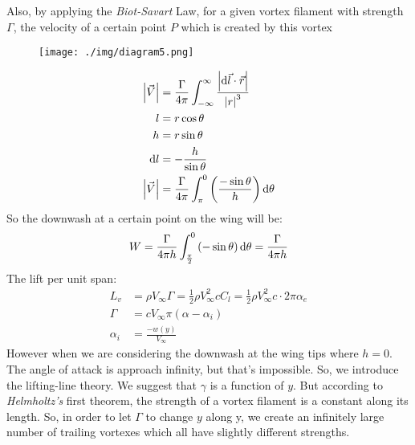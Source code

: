 Also, by applying the \textit{Biot-Savart} Law,  for a given vortex filament with strength $\Gamma$, the velocity of a certain point $P$ which is created by this vortex
\begin{figure}[H]
    \centering
    \texttt{[image: ./img/diagram5.png]}
    \caption{}
\end{figure}
\begin{align}
    \left| \vec{V} \right| & = \frac{\Gamma}{4\pi} \int_{-\infty}^{\infty} \frac{\left| \dif \vec{l} \cdot \vec{r} \right| }{ \left| r \right|^3} \\
    l                      & = r\cos{\theta}                                                                                                      \\
    h                      & = r\sin{\theta}                                                                                                      \\
    \dif l                 & = -\frac{h}{\sin{\theta}}                                                                                            \\
    \left| \vec{V} \right| & = \frac{\Gamma}{4\pi} \int_{\pi}^0 \left(\frac{-\sin{\theta}}{h}\right) \dif \theta                                  \\
\end{align}
So the downwash at a certain point on the wing will be:
\begin{align}
    W = \frac{\Gamma}{4\pi h} \int_{\frac{\pi}{2}}^0\left(-\sin{\theta}\right)\dif \theta = \frac{\Gamma}{4\pi h}
\end{align}
The lift per unit span:
\begin{align}
    L_v      & = \rho V_{\infty} \Gamma = \frac{1}{2}\rho V_{\infty}^2 c C_l = \frac{1}{2} \rho V_{\infty}^2 c \cdot 2\pi \alpha_e \\
    \Gamma   & = cV_{\infty}\pi \left(\alpha - \alpha_i\right)                                                                     \\
    \alpha_i & = \frac{-w\left(y\right)}{V_{\infty}}
\end{align}
However when we are considering the downwash at the wing tips where $h=0$. The angle of attack is approach infinity, but that's impossible. So, we introduce the lifting-line theory. We suggest that $\gamma$ is a function of $y$. But according to \textit{Helmholtz's} first theorem, the strength of a vortex filament is a constant along its length. So, in order to let $\Gamma$ to change $y$ along y, we create an infinitely large number of trailing vortexes which all have slightly different strengths.
